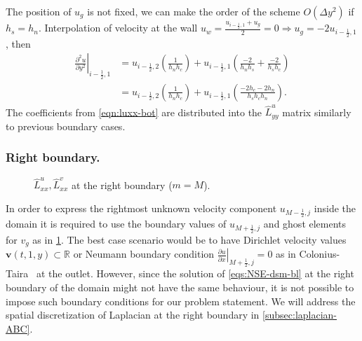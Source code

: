 \documentclass{article}
\numberwithin{equation}{section}
\begin{document}
The position of $u_g$ is not fixed, we can make the order of the scheme $O(\Delta y^2)$ if $h_s=h_n$. Interpolation of velocity at the wall $u_{w} =\frac{u_{i-\frac{1}{2},1}+u_g}{2}=0 \Rightarrow u_g=-2 u_{i-\frac{1}{2},1}$, then
\begin{equation}\label{eqn:luxx-bot}
\begin{aligned}
\left.\frac{\partial^2 u}{\partial y^2}\right|_{i-\frac{1}{2},1} 
& =u_{i-\frac{1}{2},2}\left(\frac{1}{h_n h_c}\right)+u_{i-\frac{1}{2},1}\left(\frac{-2}{h_n h_s}+\frac{-2}{h_s h_c}\right) \\
& =u_{i-\frac{1}{2},2}\left(\frac{1}{h_n h_c}\right)+u_{i-\frac{1}{2},1}\left(\frac{-2 h_c-2 h_n}{h_s h_c h_n}\right).
\end{aligned}
\end{equation}
The coefficients from \cref{eqn:luxx-bot} are distributed into the $\hat{L}^u_{yy}$ matrix similarly to previous boundary cases.

\subsubsection{Right boundary.}\label{subsubsec:laplacian-right}
\begin{figure}[H] %
  \caption{$\hat{L}^u_{xx},\hat{L}^v_{xx}$ at the right boundary ($m=M$).}\label{fig:luxx-right-first}
\end{figure}
In order to express the rightmost unknown velocity component $u_{M-\frac{1}{2},j}$ inside the domain it is required to use the boundary values of $u_{M+\frac{1}{2},j}$ and ghost elements for $v_g$ as in \cref{fig:luxx-right-first}. The best case scenario would be to have Dirichlet velocity values $\boldsymbol{v}(t,1,y)\subset \mathbb{R}$ or Neumann boundary condition $\left.\frac{\partial u}{\partial x}\right|_{M+\frac{1}{2},j}=0$ as in Colonius-Taira~\cite{Colonius:2008} at the outlet. However, since the solution of \cref{eqs:NSE-dsm-bl} at the right boundary of the domain might not have the same behaviour, it is not possible to impose such boundary conditions for our problem statement. We will address the spatial discretization of Laplacian at the right boundary in \cref{subsec:laplacian-ABC}.
\end{document}
